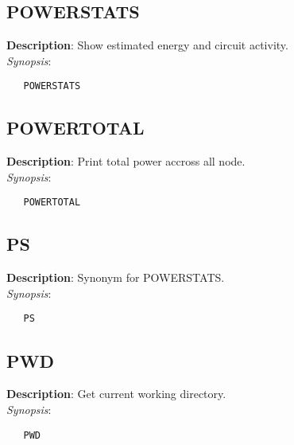 \subsection{\bf POWERSTATS}
\label{manpages:POWERSTATS}
\label{manpages:powerstats}
\vspace{-0.2in}
{\bf Description}: 	Show estimated energy and circuit activity.\\[1.5ex]
{\em Synopsis}:
\vspace{-0.2in}
\scriptsize
\begin{verbatim}
   POWERSTATS   			
\end{verbatim}
\normalsize
\vspace{-0.2in}


\subsection{\bf POWERTOTAL}
\label{manpages:POWERTOTAL}
\label{manpages:powertotal}
\vspace{-0.2in}
{\bf Description}: 	Print total power accross all node.\\[1.5ex]
{\em Synopsis}:
\vspace{-0.2in}
\scriptsize
\begin{verbatim}
   POWERTOTAL   				
\end{verbatim}
\normalsize
\vspace{-0.2in}


\subsection{\bf PS}
\label{manpages:PS}
\label{manpages:ps}
\vspace{-0.2in}
{\bf Description}: 	Synonym for POWERSTATS.\\[1.5ex]
{\em Synopsis}:
\vspace{-0.2in}
\scriptsize
\begin{verbatim}
   PS   						
\end{verbatim}
\normalsize
\vspace{-0.2in}


\subsection{\bf PWD}
\label{manpages:PWD}
\label{manpages:pwd}
\vspace{-0.2in}
{\bf Description}: 	Get current working directory.\\[1.5ex]
{\em Synopsis}:
\vspace{-0.2in}
\scriptsize
\begin{verbatim}
   PWD   					
\end{verbatim}
\normalsize
\vspace{-0.2in}


